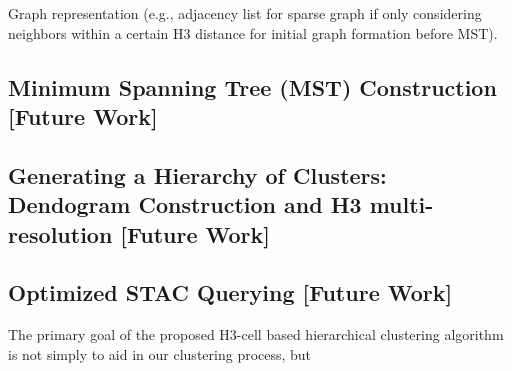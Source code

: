 \begin{multicols}{2}
Graph representation (e.g., adjacency list for sparse graph if only considering neighbors within a certain H3 distance for initial graph formation before MST).

\subsection{Minimum Spanning Tree (MST) Construction [Future Work]}

\subsection{Generating a Hierarchy of Clusters: Dendogram Construction and H3 multi-resolution [Future Work]}

\subsection{Optimized STAC Querying [Future Work]}
The primary goal of the proposed H3-cell based hierarchical clustering algorithm is not simply to aid in our clustering process, but




\end{multicols}

